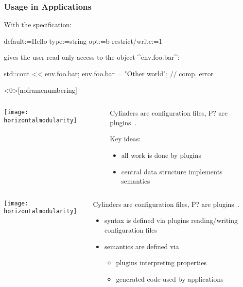 \begin{frame}[fragile]
	\frametitle{Usage in Applications}

	With the specification:
	\par
	\begin{code}
	  default:=Hello
	  type:=string
	  opt:=b
	  restrict/write:=1
	\end{code}
	\par
	 gives the user read-only access to the object ^env.foo.bar^:
	\par
	\begin{code}[language=Cpp]
	std::cout << env.foo.bar;
	env.foo.bar = "Other world"; // comp. error
	\end{code}
	\par
\end{frame}

\begin{frame}<0>[noframenumbering]
	\begin{columns}[c]
	\begin{column}{7cm}
	\texttt{[image: horizontalmodularity]}
	\end{column}
	\begin{column}{4cm}
	Cylinders are configuration files, P? are plugins~\cite{raab2016improving}.

	Key ideas:
	\begin{itemize}
	\item all work is done by plugins
	\item central data structure implements semantics
	\end{itemize}
	\end{column}
	\end{columns}
\end{frame}

\begin{frame}
	\begin{columns}[c]
	\begin{column}{6cm}
	\texttt{[image: horizontalmodularity]}
	\end{column}
	\begin{column}{5cm}
	Cylinders are configuration files, P? are plugins~\cite{raab2016improving}.

	\begin{itemize}
	\item syntax is defined via plugins reading/writing configuration files
	\item semantics are defined via
		\begin{itemize}
		\item plugins interpreting properties
		\item generated code used by applications
		\end{itemize}
	\end{itemize}
	\end{column}
	\end{columns}
\end{frame}

